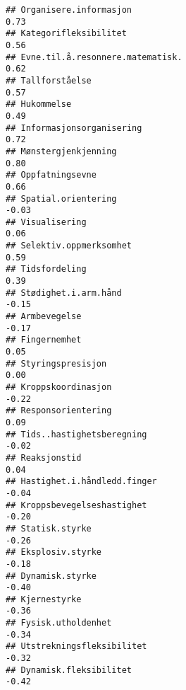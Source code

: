 \documentclass[
]{article}
\begin{document}
\begin{verbatim}
## Organisere.informasjon                                                            0.73
## Kategorifleksibilitet                                                             0.56
## Evne.til.å.resonnere.matematisk.                                                  0.62
## Tallforståelse                                                                    0.57
## Hukommelse                                                                        0.49
## Informasjonsorganisering                                                          0.72
## Mønstergjenkjenning                                                               0.80
## Oppfatningsevne                                                                   0.66
## Spatial.orientering                                                              -0.03
## Visualisering                                                                     0.06
## Selektiv.oppmerksomhet                                                            0.59
## Tidsfordeling                                                                     0.39
## Stødighet.i.arm.hånd                                                             -0.15
## Armbevegelse                                                                     -0.17
## Fingernemhet                                                                      0.05
## Styringspresisjon                                                                 0.00
## Kroppskoordinasjon                                                               -0.22
## Responsorientering                                                                0.09
## Tids..hastighetsberegning                                                        -0.02
## Reaksjonstid                                                                      0.04
## Hastighet.i.håndledd.finger                                                      -0.04
## Kroppsbevegelseshastighet                                                        -0.20
## Statisk.styrke                                                                   -0.26
## Eksplosiv.styrke                                                                 -0.18
## Dynamisk.styrke                                                                  -0.40
## Kjernestyrke                                                                     -0.36
## Fysisk.utholdenhet                                                               -0.34
## Utstrekningsfleksibilitet                                                        -0.32
## Dynamisk.fleksibilitet                                                           -0.42

\end{verbatim}
\end{document}
